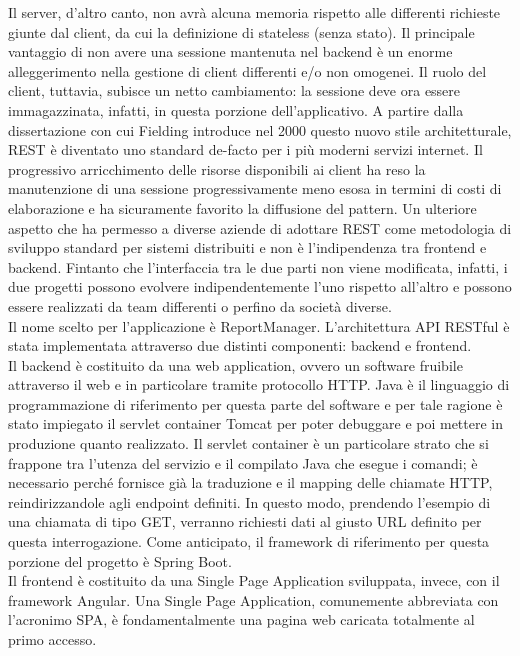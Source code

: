 Il server, d'altro canto, non avrà alcuna memoria rispetto alle differenti richieste giunte dal client, da cui la definizione di stateless (senza stato).
Il principale vantaggio di non avere una sessione mantenuta nel backend è un enorme alleggerimento nella gestione di client differenti e/o non omogenei.
Il ruolo del client, tuttavia, subisce un netto cambiamento: la sessione deve ora essere immagazzinata, infatti, in questa porzione dell'applicativo.
A partire dalla dissertazione con cui Fielding introduce nel 2000 questo nuovo stile architetturale, REST è diventato uno standard de-facto per i più moderni servizi internet.
Il progressivo arricchimento delle risorse disponibili ai client ha reso la manutenzione di una sessione progressivamente meno esosa in termini di costi di elaborazione e ha sicuramente favorito la diffusione del pattern.
Un ulteriore aspetto che ha permesso a diverse aziende di adottare REST come metodologia di sviluppo standard per sistemi distribuiti e non è l'indipendenza tra frontend e backend.
Fintanto che l'interfaccia tra le due parti non viene modificata, infatti, i due progetti possono evolvere indipendentemente l'uno rispetto all'altro e possono essere realizzati da team differenti o perfino da società diverse.
\\
Il nome scelto per l'applicazione è ReportManager.
L'architettura API RESTful è stata implementata attraverso due distinti componenti: backend e frontend.
\\
Il backend è costituito da una web application, ovvero un software fruibile attraverso il web e in particolare tramite protocollo HTTP.
Java è il linguaggio di programmazione di riferimento per questa parte del software e per tale ragione è stato impiegato il servlet container Tomcat per poter debuggare e poi
mettere in produzione quanto realizzato.
Il servlet container è un particolare strato che si frappone tra l'utenza del servizio e il compilato Java che esegue i comandi; è necessario perché fornisce già 
la traduzione e il mapping delle chiamate HTTP, reindirizzandole agli endpoint definiti.
In questo modo, prendendo l'esempio di una chiamata di tipo GET, verranno richiesti dati al giusto URL definito per questa interrogazione.
Come anticipato, il framework di riferimento per questa porzione del progetto è Spring Boot.
\\
Il frontend è costituito da una Single Page Application sviluppata, invece, con il framework Angular.
Una Single Page Application, comunemente abbreviata con l'acronimo SPA, è fondamentalmente una pagina web caricata totalmente al primo accesso.
